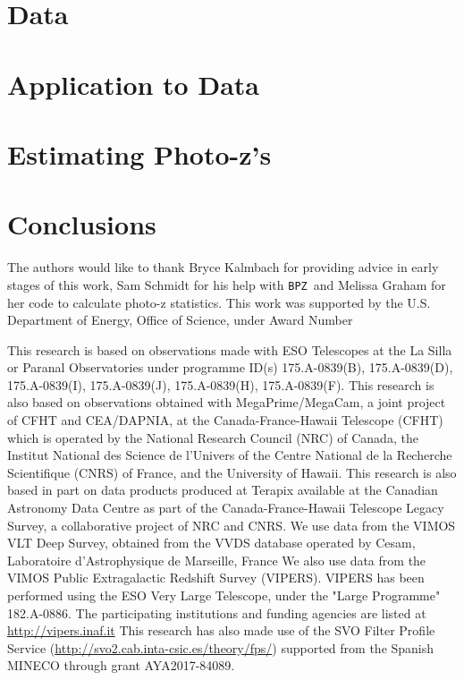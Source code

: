 \documentclass[twocolumn]{aastex63}
\newcommand{\pzcode}[1]{\texttt{#1}}
\newcommand{\bpz}{\pzcode{BPZ}}
\begin{document}
\section{Data}
    
    
\section{Application to Data}
      
    
\section{Estimating Photo-z's}
    

\section{Conclusions}
    

\acknowledgments

The authors would like to thank Bryce Kalmbach for providing advice in early stages of this work, Sam Schmidt for his help with \bpz\, and Melissa Graham for her code to calculate photo-z statistics.
This work was supported by the U.S. Department of Energy, Office of Science, under Award Number

This research is based on observations made with ESO Telescopes at the La Silla or Paranal Observatories under programme ID(s) 175.A-0839(B), 175.A-0839(D), 175.A-0839(I), 175.A-0839(J), 175.A-0839(H), 175.A-0839(F).
This research is also based on observations obtained with MegaPrime/MegaCam, a joint project of CFHT and CEA/DAPNIA, at the Canada-France-Hawaii Telescope (CFHT) which is operated by the National Research Council (NRC) of Canada, the Institut National des Science de l'Univers of the Centre National de la Recherche Scientifique (CNRS) of France, and the University of Hawaii.
This research is also based in part on data products produced at Terapix available at the Canadian Astronomy Data Centre as part of the Canada-France-Hawaii Telescope Legacy Survey, a collaborative project of NRC and CNRS.
We use data from the VIMOS VLT Deep Survey, obtained from the VVDS database operated by Cesam, Laboratoire d'Astrophysique de Marseille, France
We also use data from the VIMOS Public Extragalactic Redshift Survey (VIPERS).
VIPERS has been performed using the ESO Very Large Telescope, under the "Large Programme" 182.A-0886. 
The participating institutions and funding agencies are listed at \url{http://vipers.inaf.it}
This research has also made use of the SVO Filter Profile Service (\url{http://svo2.cab.inta-csic.es/theory/fps/}) supported from the Spanish MINECO through grant AYA2017-84089.

    


{}

\end{document}
